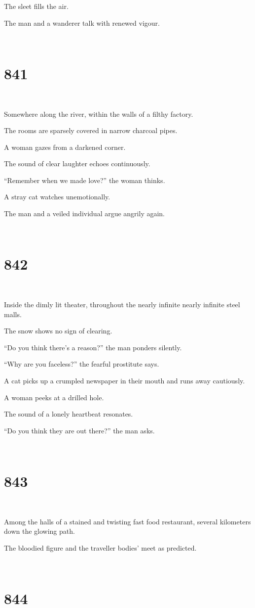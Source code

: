 \documentclass{report}
\begin{document}
The sleet fills the air.

The man and a wanderer talk with renewed vigour.

~
\chapter*{841}
~

Somewhere along the river, within the walls of a filthy factory.

The rooms are sparsely covered in narrow charcoal pipes.

A woman gazes from a darkened corner.

The sound of clear laughter echoes continuously.

``Remember when we made love?'' the woman thinks.

A stray cat watches unemotionally.

The man and a veiled individual argue angrily again.

~
\chapter*{842}
~

Inside the dimly lit theater, throughout the nearly infinite nearly infinite steel malls.

The snow shows no sign of clearing.

``Do you think there's a reason?'' the man ponders silently.

``Why are you faceless?'' the fearful prostitute says.

A cat picks up a crumpled newspaper in their mouth and runs away cautiously.

A woman peeks at a drilled hole.

The sound of a lonely heartbeat resonates.

``Do you think they are out there?'' the man asks.

~
\chapter*{843}
~

Among the halls of a stained and twisting fast food restaurant, several kilometers down the glowing path.

The bloodied figure and the traveller bodies' meet as predicted.

~
\chapter*{844}
~
\end{document}
